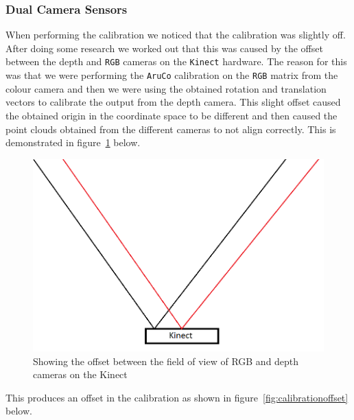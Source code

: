\documentclass{article}
\begin{document}
\subsubsection{Dual Camera Sensors}
When performing the calibration we noticed that the calibration was slightly off. After doing some research we worked out that this was caused by the offset between the depth and \texttt{RGB} cameras on the \texttt{Kinect} hardware. The reason for this was that we were performing the \texttt{AruCo} \cite{aruco} calibration on the \texttt{RGB} matrix from the colour camera and then we were using the obtained rotation and translation vectors to calibrate the output from the depth camera. This slight offset caused the obtained origin in the coordinate space to be different and then caused the point clouds obtained from the different cameras to not align correctly. This is demonstrated in figure~\ref{fig:rgbdepth} below.
\begin{figure}[h]
  \centering
  \includegraphics[scale=0.4]{rgbdepth}
  \caption{Showing the offset between the field of view of RGB and depth cameras on the Kinect}
  \label{fig:rgbdepth}
\end{figure}
This produces an offset in the calibration as shown in figure~\ref{fig:calibrationoffset} below.
\\
\end{document}
